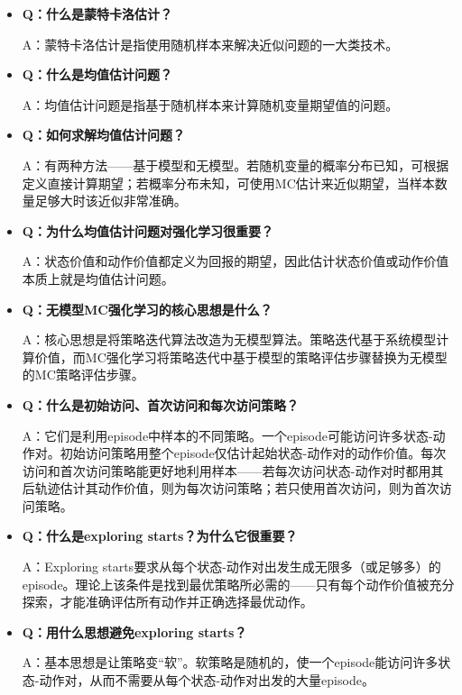 \documentclass[UTF8]{article}
\begin{document}
\begin{itemize}
    \item \textbf{Q：什么是蒙特卡洛估计？}

    A：蒙特卡洛估计是指使用随机样本来解决近似问题的一大类技术。

    \item \textbf{Q：什么是均值估计问题？}

    A：均值估计问题是指基于随机样本来计算随机变量期望值的问题。

    \item \textbf{Q：如何求解均值估计问题？}

    A：有两种方法——基于模型和无模型。若随机变量的概率分布已知，可根据定义直接计算期望；若概率分布未知，可使用MC估计来近似期望，当样本数量足够大时该近似非常准确。

    \item \textbf{Q：为什么均值估计问题对强化学习很重要？}

    A：状态价值和动作价值都定义为回报的期望，因此估计状态价值或动作价值本质上就是均值估计问题。

    \item \textbf{Q：无模型MC强化学习的核心思想是什么？}

    A：核心思想是将策略迭代算法改造为无模型算法。策略迭代基于系统模型计算价值，而MC强化学习将策略迭代中基于模型的策略评估步骤替换为无模型的MC策略评估步骤。

    \item \textbf{Q：什么是初始访问、首次访问和每次访问策略？}

    A：它们是利用episode中样本的不同策略。一个episode可能访问许多状态-动作对。初始访问策略用整个episode仅估计起始状态-动作对的动作价值。每次访问和首次访问策略能更好地利用样本——若每次访问状态-动作对时都用其后轨迹估计其动作价值，则为每次访问策略；若只使用首次访问，则为首次访问策略。

    \item \textbf{Q：什么是exploring starts？为什么它很重要？}

    A：Exploring starts要求从每个状态-动作对出发生成无限多（或足够多）的episode。理论上该条件是找到最优策略所必需的——只有每个动作价值被充分探索，才能准确评估所有动作并正确选择最优动作。

    \item \textbf{Q：用什么思想避免exploring starts？}

    A：基本思想是让策略变“软”。软策略是随机的，使一个episode能访问许多状态-动作对，从而不需要从每个状态-动作对出发的大量episode。


\end{itemize}
\end{document}
